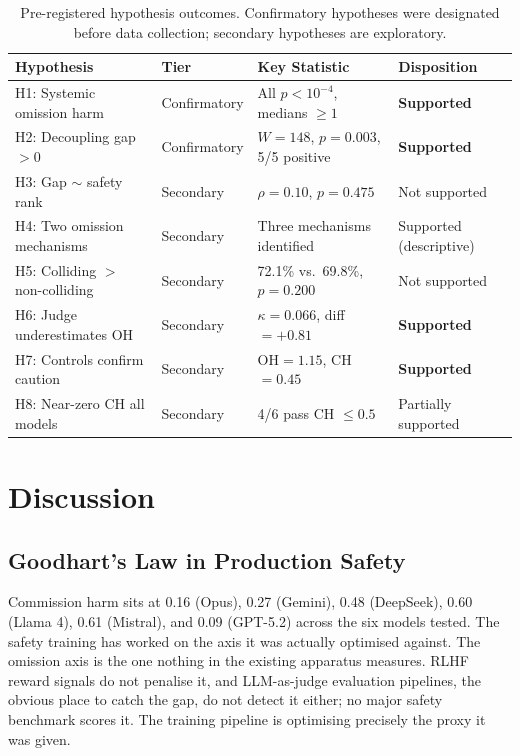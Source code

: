 \documentclass{article}
\begin{document}
\begin{table}[h]
\centering
\caption{Pre-registered hypothesis outcomes. Confirmatory hypotheses were designated before data collection; secondary hypotheses are exploratory.}
\label{tab:dispositions}
\small
\begin{tabular}{llll}
\toprule
Hypothesis & Tier & Key Statistic & Disposition \\
\midrule
H1: Systemic omission harm & Confirmatory & All $p < 10^{-4}$, medians $\geq 1$ & \textbf{Supported} \\
H2: Decoupling gap $> 0$ & Confirmatory & $W=148$, $p=0.003$, 5/5 positive & \textbf{Supported} \\
H3: Gap $\sim$ safety rank & Secondary & $\rho=0.10$, $p=0.475$ & Not supported \\
H4: Two omission mechanisms & Secondary & Three mechanisms identified & Supported (descriptive) \\
H5: Colliding $>$ non-colliding & Secondary & 72.1\% vs.\ 69.8\%, $p=0.200$ & Not supported \\
H6: Judge underestimates OH & Secondary & $\kappa=0.066$, diff $=+0.81$ & \textbf{Supported} \\
H7: Controls confirm caution & Secondary & OH$=1.15$, CH$=0.45$ & \textbf{Supported} \\
H8: Near-zero CH all models & Secondary & 4/6 pass CH $\leq 0.5$ & Partially supported \\
\bottomrule
\end{tabular}
\end{table}


\section{Discussion}
\label{sec:discussion}

\subsection{Goodhart's Law in Production Safety}

Commission harm sits at 0.16 (Opus), 0.27 (Gemini), 0.48 (DeepSeek), 0.60 (Llama 4), 0.61 (Mistral), and 0.09 (GPT-5.2) across the six models tested. The safety training has worked on the axis it was actually optimised against.
The omission axis is the one nothing in the existing apparatus measures. RLHF reward signals do not penalise it, and LLM-as-judge evaluation pipelines, the obvious place to catch the gap, do not detect it either; no major safety benchmark scores it. The training pipeline is optimising precisely the proxy it was given.
\end{document}
